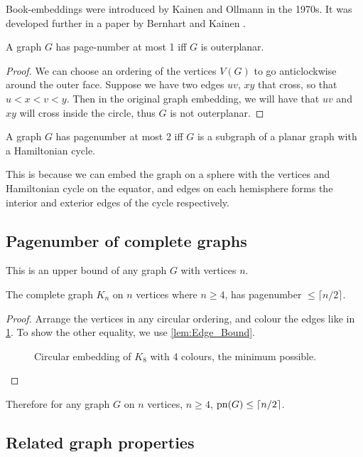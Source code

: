 Book-embeddings were introduced by Kainen and Ollmann in the 1970s.\cite{kainenRecentResultsTopological1974, ollmannBookThicknessVarious1973} It was developed further in a paper by Bernhart and Kainen \cite{bernhartBookThicknessGraph1979}. 
\begin{lemma}\label{lem:Pagenumber_1}
	A graph $G$ has page-number at most 1 iff $G$ is outerplanar.
\end{lemma}
\begin{proof}
	We can choose an ordering of the vertices $V(G)$ to go anticlockwise around the outer face. Suppose we have two edges $uv$, $xy$ that cross, so that $u < x < v < y$. Then in the original graph embedding, we will have that $uv$ and $xy$ will cross inside the circle, thus $G$ is not outerplanar. 
\end{proof}
\begin{lemma}\label{lem:Pagenumber_2}
	A graph $G$ has pagenumber at most 2 iff $G$ is a subgraph of a planar graph with a Hamiltonian cycle.
\end{lemma}
This is because we can embed the graph on a sphere with the vertices and Hamiltonian cycle on the equator, and edges on each hemisphere forms the interior and exterior edges of the cycle respectively.

\subsection{Pagenumber of complete graphs}\label{ssec:Pagenumber_Complete_Graphs}
This is an upper bound of any graph $G$ with vertices $n$. 
\begin{theorem}\label{thm:Pagenumber_Complete_Graph}
	The complete graph $K_n$ on $n$ vertices where $n \geq 4$, has pagenumber $ \leq \lceil n/2 \rceil$. 
\end{theorem}
\begin{proof}
	Arrange the vertices in any circular ordering, and colour the edges like in \cref{fig:k8 coloured with colours}. To show the other equality, we use \cref{lem:Edge_Bound}.
	\begin{figure}[h]
		\caption{Circular embedding of $K_8$ with 4 colours, the minimum possible.}
		\centering
		
		\label{fig:k8 coloured with colours}
	\end{figure}
\end{proof}
Therefore for any graph $G$ on $n$ vertices, $n \geq 4$, $\text{pn}(G) \leq \lceil n/2 \rceil$. 
\subsection{Related graph properties}\label{ssec:Related_Properties}

